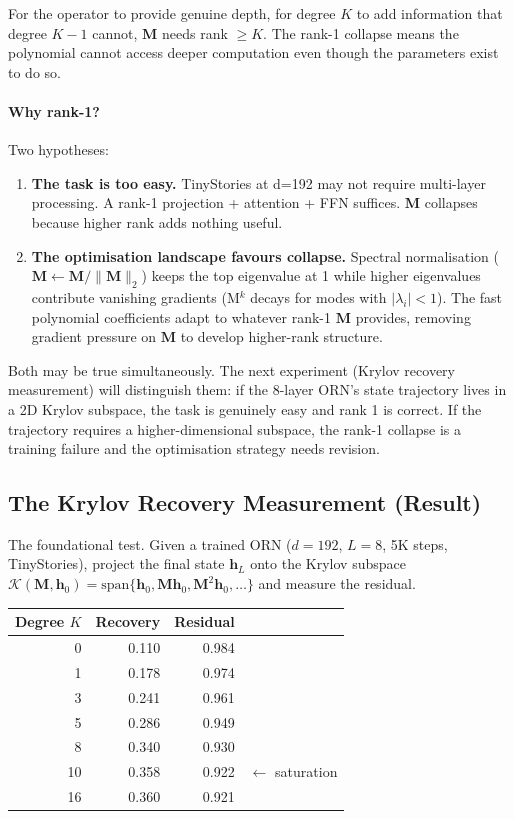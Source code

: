 \documentclass[11pt, a4paper]{article}
\newcommand{\M}{\mathbf{M}}
\newcommand{\h}{\mathbf{h}}
\theoremstyle{plain}
\theoremstyle{definition}
\theoremstyle{remark}
\begin{document}
For the operator to provide genuine depth, for degree $K$ to add information that degree $K{-}1$ cannot, $\M$ needs rank $\geq K$.
The rank-1 collapse means the polynomial cannot access deeper computation even though the parameters exist to do so.

\paragraph{Why rank-1?}
Two hypotheses:
\begin{enumerate}[nosep]
\item \textbf{The task is too easy.} TinyStories at d=192 may not require multi-layer processing. A rank-1 projection + attention + FFN suffices. $\M$ collapses because higher rank adds nothing useful.
\item \textbf{The optimisation landscape favours collapse.} Spectral normalisation ($\M \leftarrow \M / \|\M\|_2$) keeps the top eigenvalue at 1 while higher eigenvalues contribute vanishing gradients (M$^k$ decays for modes with $|\lambda_i| < 1$). The fast polynomial coefficients adapt to whatever rank-1 $\M$ provides, removing gradient pressure on $\M$ to develop higher-rank structure.
\end{enumerate}

Both may be true simultaneously.
The next experiment (Krylov recovery measurement) will distinguish them: if the 8-layer ORN's state trajectory lives in a 2D Krylov subspace, the task is genuinely easy and rank 1 is correct.
If the trajectory requires a higher-dimensional subspace, the rank-1 collapse is a training failure and the optimisation strategy needs revision.

\subsection{The Krylov Recovery Measurement (Result)}

The foundational test.
Given a trained ORN ($d{=}192$, $L{=}8$, 5K steps, TinyStories), project the final state $\h_L$ onto the Krylov subspace $\mathcal{K}(\M, \h_0) = \text{span}\{\h_0, \M \h_0, \M^2 \h_0, \ldots\}$ and measure the residual.

\begin{center}\small
\begin{tabular}{rrrl}
\toprule
\textbf{Degree $K$} & \textbf{Recovery} & \textbf{Residual} & \\
\midrule
0 & 0.110 & 0.984 & \\
1 & 0.178 & 0.974 & \\
3 & 0.241 & 0.961 & \\
5 & 0.286 & 0.949 & \\
8 & 0.340 & 0.930 & \\
10 & 0.358 & 0.922 & $\leftarrow$ saturation \\
16 & 0.360 & 0.921 & \\
\bottomrule
\end{tabular}
\end{center}
\end{document}
